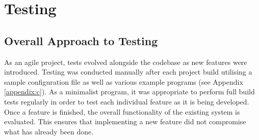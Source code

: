 \chapter{Testing}







\section{Overall Approach to Testing}

As an agile project, tests evolved alongside the codebase as new features were introduced. Testing was conducted manually after each project build utilising a sample configuration file as well as various example programs (see Appendix \ref{appendix:c}). As a minimalist program, it was appropriate to perform full build tests regularly in order to test each individual feature as it is being developed. Once a feature is finished, the overall functionality of the existing system is evaluated. This ensures that implementing a new feature did not compromise what has already been done.

